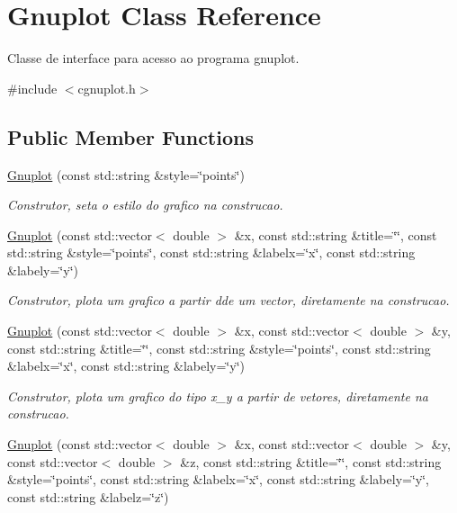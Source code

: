 \hypertarget{class_gnuplot}{}\section{Gnuplot Class Reference}
\label{class_gnuplot}


Classe de interface para acesso ao programa gnuplot.  




{\ttfamily \#include $<$cgnuplot.\+h$>$}

\subsection*{Public Member Functions}
\begin{DoxyCompactItemize}
\item 
\hyperlink{class_gnuplot_a187eb517b362cf379492fe7f1621ee50}{Gnuplot} (const std\+::string \&style=\char`\"{}points\char`\"{})
\begin{DoxyCompactList}\small\item\em Construtor, seta o estilo do grafico na construcao. \end{DoxyCompactList}\item 
\hyperlink{class_gnuplot_a8ceac5808e42665c1dee305ae7ea9070}{Gnuplot} (const std\+::vector$<$ double $>$ \&x, const std\+::string \&title=\char`\"{}\char`\"{}, const std\+::string \&style=\char`\"{}points\char`\"{}, const std\+::string \&labelx=\char`\"{}x\char`\"{}, const std\+::string \&labely=\char`\"{}y\char`\"{})
\begin{DoxyCompactList}\small\item\em Construtor, plota um grafico a partir dde um vector, diretamente na construcao. \end{DoxyCompactList}\item 
\hyperlink{class_gnuplot_a24327b6116c71acdc195eadf665c67cb}{Gnuplot} (const std\+::vector$<$ double $>$ \&x, const std\+::vector$<$ double $>$ \&y, const std\+::string \&title=\char`\"{}\char`\"{}, const std\+::string \&style=\char`\"{}points\char`\"{}, const std\+::string \&labelx=\char`\"{}x\char`\"{}, const std\+::string \&labely=\char`\"{}y\char`\"{})
\begin{DoxyCompactList}\small\item\em Construtor, plota um grafico do tipo x\+\_\+y a partir de vetores, diretamente na construcao. \end{DoxyCompactList}\item 
\hyperlink{class_gnuplot_a14191e89154f2716608f6907975cc012}{Gnuplot} (const std\+::vector$<$ double $>$ \&x, const std\+::vector$<$ double $>$ \&y, const std\+::vector$<$ double $>$ \&z, const std\+::string \&title=\char`\"{}\char`\"{}, const std\+::string \&style=\char`\"{}points\char`\"{}, const std\+::string \&labelx=\char`\"{}x\char`\"{}, const std\+::string \&labely=\char`\"{}y\char`\"{}, const std\+::string \&labelz=\char`\"{}z\char`\"{})

\end{DoxyCompactItemize}
